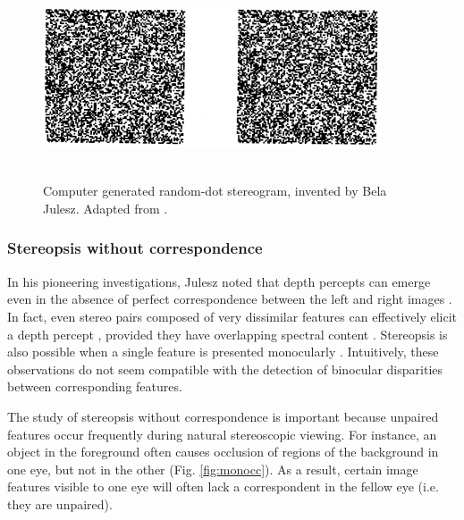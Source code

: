 \begin{figure}
  \centering
  \includegraphics[width=10cm, height=6cm, keepaspectratio]{rds-julesz}
  \caption[Computer generated random-dot stereogram.]{Computer generated random-dot stereogram, invented by Bela Julesz. Adapted from \cite{JULESZ:1964ff}.}
  \label{fig:rds}
\end{figure}

\subsubsection{Stereopsis without correspondence} 

In his pioneering investigations, Julesz noted that depth percepts can emerge even in the absence of perfect correspondence between the left and right images \cite{JULESZ:1964ff}. In fact, even stereo pairs composed of very dissimilar features can effectively elicit a depth percept \cite{KAUFMAN:1964kx,KAUFMAN:1965vn,Mayhew:1976ys}, provided they have overlapping spectral content \cite{Mayhew:1976ys}. Stereopsis is also possible when a single feature is presented monocularly \cite{Kaye:1978os,Wilcox:2007zt}. Intuitively, these observations do not seem compatible with the detection of binocular disparities between corresponding features.

The study of stereopsis without correspondence is important because unpaired features occur frequently during natural stereoscopic viewing. For instance, an object in the foreground often causes occlusion of regions of the background in one eye, but not in the other (Fig. \ref{fig:monocc}). As a result, certain image features visible to one eye will often lack a correspondent in the fellow eye (i.e. they are unpaired).

